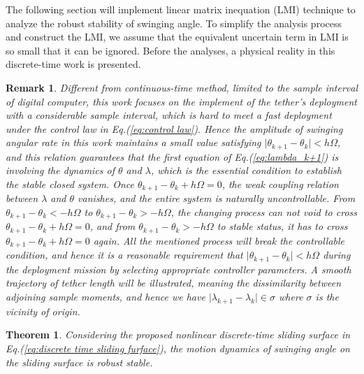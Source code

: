 \documentclass[10pt,onecolumn,draftcls]{IEEEtran}
\newtheorem{myrem}{Remark}
\newtheorem{mythm}{Theorem}
\begin{document}
	The following section will implement linear matrix inequation (LMI) technique to analyze the robust stability of swinging angle. To simplify the analysis process and construct the LMI, we assume that the equivalent uncertain term in LMI is so small that it can be ignored. Before the analyses, a physical reality in this discrete-time work is presented.
	\begin{myrem}\label{rem:2}
		Different from continuous-time method, limited to the sample interval of digital computer, this work focuses on the implement of the tether's deployment with a considerable sample interval, which is hard to meet a fast deployment under the control law in Eq.(\ref{eq:control law}). Hence the amplitude of swinging angular rate in this work maintains a small value satisfying $\vert\theta_{k+1}-\theta_k\vert<h\Omega$,  and this relation guarantees that the first equation of Eq.(\ref{eq:lambda_k+1}) is involving the dynamics of $\theta$ and $\lambda$, which is the essential condition to establish the stable closed system. Once $\theta_{k+1}-\theta_k+h\Omega=0$, the weak coupling relation between $\lambda$ and $\theta$ vanishes, and the entire system is naturally uncontrollable. From $\theta_{k+1}-\theta_k<-h\Omega$ to $\theta_{k+1}-\theta_k>-h\Omega$, the changing process can not void to cross $\theta_{k+1}-\theta_k+h\Omega=0$, and from $\theta_{k+1}-\theta_k>-h\Omega$ to stable status, it has to cross $\theta_{k+1}-\theta_k+h\Omega=0$ again. All the mentioned process will break the controllable condition, and hence it is a reasonable requirement that $\vert\theta_{k+1}-\theta_k\vert<h\Omega$ during the deployment mission by selecting appropriate controller parameters. A smooth trajectory of tether length will be illustrated, meaning the dissimilarity between adjoining sample moments, and hence we have $\vert\lambda_{k+1}-\lambda_{k}\vert\in \sigma$ where $\sigma$ is the vicinity of origin.  
	\end{myrem}
	\begin{mythm}
		Considering the proposed nonlinear discrete-time sliding surface in Eq.(\ref{eq:discrete time sliding furface}), the motion dynamics of swinging angle on the sliding surface is robust stable.
	\end{mythm}
\end{document}
